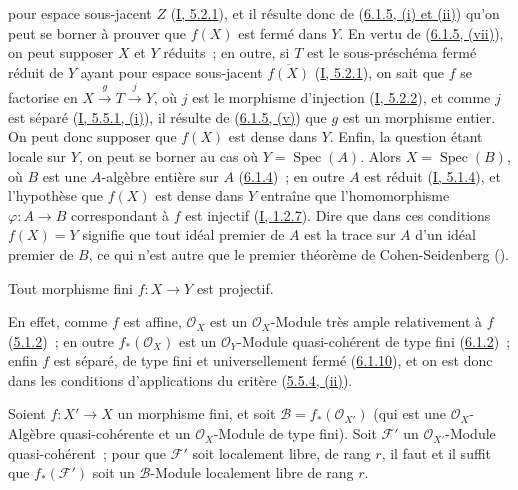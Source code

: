 
pour espace sous-jacent $Z$ (\hyperref[I.5.2.1-fr]{I, 5.2.1}), et il résulte
donc de (\hyperref[II.6.1.5-fr]{6.1.5, (i) et (ii)}) qu'on peut se borner à
prouver que $f(X)$ est fermé dans $Y$. En vertu de
(\hyperref[II.6.1.5-fr]{6.1.5, (vii)}), on peut supposer $X$ et $Y$ réduits~;
en outre, si $T$ est le sous-préschéma fermé réduit de $Y$ ayant pour espace
sous-jacent $\overline{f(X)}$ (\hyperref[I.5.2.1-fr]{I, 5.2.1}), on sait que
$f$ se factorise en $X\xrightarrow{g}T\xrightarrow{j}Y$, où $j$ est le
morphisme d'injection (\hyperref[I.5.2.2-fr]{I, 5.2.2}), et comme $j$ est
séparé (\hyperref[I.5.5.1-fr]{I, 5.5.1, (i)}), il résulte de
(\hyperref[II.6.1.5-fr]{6.1.5, (v)}) que $g$ est un morphisme entier. On peut
donc supposer que $f(X)$ est dense dans $Y$. Enfin, la question étant locale
sur $Y$, on peut se borner au cas où $Y=\operatorname{Spec}(A)$. Alors
$X=\operatorname{Spec}(B)$, où $B$ est une $A$-algèbre entière sur $A$
(\hyperref[II.6.1.4-fr]{6.1.4})~; en outre $A$ est réduit
(\hyperref[I.5.1.4-fr]{I, 5.1.4}), et l'hypothèse que $f(X)$ est dense dans
$Y$ entraîne que l'homomorphisme $\varphi:A\to B$ correspondant à $f$ est
injectif (\hyperref[I.1.2.7-fr]{I, 1.2.7}). Dire que dans ces conditions
$f(X)=Y$ signifie que tout idéal premier de $A$ est la trace sur $A$ d'un
idéal premier de $B$, ce qui n'est autre que le premier théorème de
Cohen-Seidenberg (\cite[t.~I, p.~257, th.~3]{I-13}).

\begin{corollary}[6.1.11]
\label{II.6.1.11-fr}
Tout morphisme fini $f:X\to Y$ est projectif.
\end{corollary}

En effet, comme $f$ est affine, $\mathcal{O}_X$ est un
$\mathcal{O}_X$-Module très ample relativement à $f$
(\hyperref[II.5.1.2-fr]{5.1.2})~; en outre $f_*(\mathcal{O}_X)$ est un
$\mathcal{O}_Y$-Module quasi-cohérent de type fini
(\hyperref[II.6.1.2-fr]{6.1.2})~; enfin $f$ est séparé, de type fini et
universellement fermé (\hyperref[II.6.1.10-fr]{6.1.10}), et on est donc dans
les conditions d'applications du critère
(\hyperref[II.5.5.4-fr]{5.5.4, (ii)}).

\begin{proposition}[6.1.12]
\label{II.6.1.12-fr}
Soient $f:X'\to X$ un morphisme fini, et soit
$\mathcal{B}=f_*(\mathcal{O}_{X'})$ (qui est une $\mathcal{O}_X$-Algèbre
quasi-cohérente et un $\mathcal{O}_X$-Module de type fini). Soit
$\mathcal{F}'$ un $\mathcal{O}_{X'}$-Module quasi-cohérent~; pour que
$\mathcal{F}'$ soit localement libre, de rang $r$, il faut et il suffit que
$f_*(\mathcal{F}')$ soit un $\mathcal{B}$-Module localement libre de rang
$r$.
\end{proposition}

